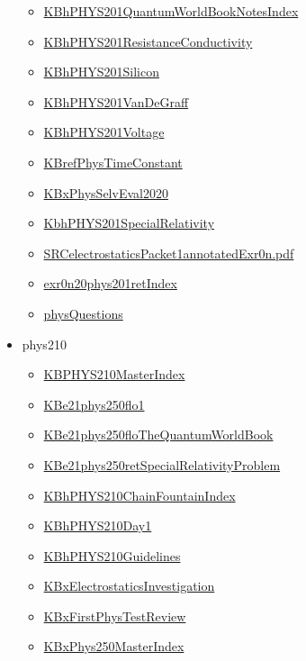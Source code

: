 \documentclass[11pt]{article}
\begin{document}
\begin{itemize}
\begin{itemize}
\item \href{phys201/KBhPHYS201QuantumWorldBookNotesIndex.org}{KBhPHYS201QuantumWorldBookNotesIndex}
\item \href{phys201/KBhPHYS201ResistanceConductivity.org}{KBhPHYS201ResistanceConductivity}
\item \href{phys201/KBhPHYS201Silicon.org}{KBhPHYS201Silicon}
\item \href{phys201/KBhPHYS201VanDeGraff.org}{KBhPHYS201VanDeGraff}
\item \href{phys201/KBhPHYS201Voltage.org}{KBhPHYS201Voltage}
\item \href{phys201/KBrefPhysTimeConstant.org}{KBrefPhysTimeConstant}
\item \href{phys201/KBxPhysSelvEval2020.org}{KBxPhysSelvEval2020}
\item \href{phys201/KbhPHYS201SpecialRelativity.org}{KbhPHYS201SpecialRelativity}
\item \href{phys201/SRCelectrostaticsPacket1annotatedExr0n.pdf.org}{SRCelectrostaticsPacket1annotatedExr0n.pdf}
\item \href{phys201/exr0n20phys201retIndex.org}{exr0n20phys201retIndex}
\item \href{phys201/physQuestions.org}{physQuestions}
\end{itemize}
\item phys210
\begin{itemize}
\item \href{phys210/KBPHYS210MasterIndex.org}{KBPHYS210MasterIndex}
\item \href{phys210/KBe21phys250flo1.org}{KBe21phys250flo1}
\item \href{phys210/KBe21phys250floTheQuantumWorldBook.org}{KBe21phys250floTheQuantumWorldBook}
\item \href{phys210/KBe21phys250retSpecialRelativityProblem.org}{KBe21phys250retSpecialRelativityProblem}
\item \href{phys210/KBhPHYS210ChainFountainIndex.org}{KBhPHYS210ChainFountainIndex}
\item \href{phys210/KBhPHYS210Day1.org}{KBhPHYS210Day1}
\item \href{phys210/KBhPHYS210Guidelines.org}{KBhPHYS210Guidelines}
\item \href{phys210/KBxElectrostaticsInvestigation.org}{KBxElectrostaticsInvestigation}
\item \href{phys210/KBxFirstPhysTestReview.org}{KBxFirstPhysTestReview}
\item \href{phys210/KBxPhys250MasterIndex.org}{KBxPhys250MasterIndex}

\end{itemize}
\end{itemize}
\end{document}

